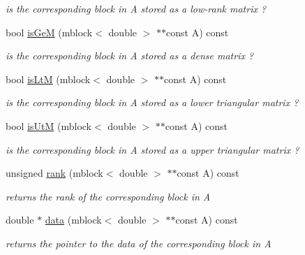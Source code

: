 \begin{DoxyCompactItemize}
\begin{DoxyCompactList}\small\item\em is the corresponding block in \-A stored as a low-\/rank matrix ? \end{DoxyCompactList}\item 
\hypertarget{classblcluster_a4b359db7358c361e1ec5fc7f8bed20b1}{
bool \hyperlink{classblcluster_a4b359db7358c361e1ec5fc7f8bed20b1}{is\-Ge\-M} (mblock$<$ double $>$ $\ast$$\ast$const \-A) const }
\label{classblcluster_a4b359db7358c361e1ec5fc7f8bed20b1}

\begin{DoxyCompactList}\small\item\em is the corresponding block in \-A stored as a dense matrix ? \end{DoxyCompactList}\item 
\hypertarget{classblcluster_ae1afe52fd8bae23b6e15b3ed44b4da85}{
bool \hyperlink{classblcluster_ae1afe52fd8bae23b6e15b3ed44b4da85}{is\-Lt\-M} (mblock$<$ double $>$ $\ast$$\ast$const \-A) const }
\label{classblcluster_ae1afe52fd8bae23b6e15b3ed44b4da85}

\begin{DoxyCompactList}\small\item\em is the corresponding block in \-A stored as a lower triangular matrix ? \end{DoxyCompactList}\item 
\hypertarget{classblcluster_a6a971b2f295e5e6da5d3b2e9796c5ba4}{
bool \hyperlink{classblcluster_a6a971b2f295e5e6da5d3b2e9796c5ba4}{is\-Ut\-M} (mblock$<$ double $>$ $\ast$$\ast$const \-A) const }
\label{classblcluster_a6a971b2f295e5e6da5d3b2e9796c5ba4}

\begin{DoxyCompactList}\small\item\em is the corresponding block in \-A stored as a upper triangular matrix ? \end{DoxyCompactList}\item 
\hypertarget{classblcluster_a98a2a2481a61f1a0512a26f7b927453e}{
unsigned \hyperlink{classblcluster_a98a2a2481a61f1a0512a26f7b927453e}{rank} (mblock$<$ double $>$ $\ast$$\ast$const \-A) const }
\label{classblcluster_a98a2a2481a61f1a0512a26f7b927453e}

\begin{DoxyCompactList}\small\item\em returns the rank of the corresponding block in \-A \end{DoxyCompactList}\item 
\hypertarget{classblcluster_ad4b1910a034cd61a7da077881bae1e87}{
double $\ast$ \hyperlink{classblcluster_ad4b1910a034cd61a7da077881bae1e87}{data} (mblock$<$ double $>$ $\ast$$\ast$const \-A) const }
\label{classblcluster_ad4b1910a034cd61a7da077881bae1e87}

\begin{DoxyCompactList}\small\item\em returns the pointer to the data of the corresponding block in \-A \end{DoxyCompactList}\end{DoxyCompactItemize}
